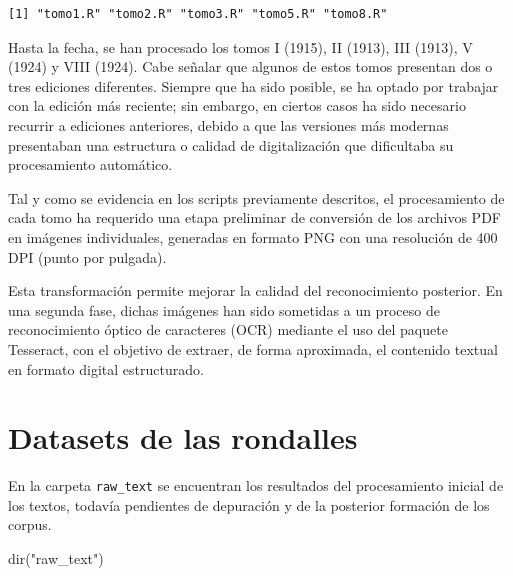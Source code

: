 \documentclass[
  letterpaper,
  DIV=11,
  numbers=noendperiod]{scrreprt}
\newenvironment{Shaded}{\begin{snugshade}}{\end{snugshade}}
\newcommand{\AttributeTok}[1]{\textcolor[rgb]{0.40,0.45,0.13}{#1}}
\newcommand{\FunctionTok}[1]{\textcolor[rgb]{0.28,0.35,0.67}{#1}}
\newcommand{\NormalTok}[1]{\textcolor[rgb]{0.00,0.23,0.31}{#1}}
\newcommand{\SpecialCharTok}[1]{\textcolor[rgb]{0.37,0.37,0.37}{#1}}
\newcommand{\StringTok}[1]{\textcolor[rgb]{0.13,0.47,0.30}{#1}}
\begin{document}
\begin{Shaded}
\end{Shaded}

\begin{verbatim}
[1] "tomo1.R" "tomo2.R" "tomo3.R" "tomo5.R" "tomo8.R"
\end{verbatim}

Hasta la fecha, se han procesado los tomos I (1915), II (1913), III
(1913), V (1924) y VIII (1924). Cabe señalar que algunos de estos tomos
presentan dos o tres ediciones diferentes. Siempre que ha sido posible,
se ha optado por trabajar con la edición más reciente; sin embargo, en
ciertos casos ha sido necesario recurrir a ediciones anteriores, debido
a que las versiones más modernas presentaban una estructura o calidad de
digitalización que dificultaba su procesamiento automático.

Tal y como se evidencia en los scripts previamente descritos, el
procesamiento de cada tomo ha requerido una etapa preliminar de
conversión de los archivos PDF en imágenes individuales, generadas en
formato PNG con una resolución de 400 DPI (punto por pulgada).

Esta transformación permite mejorar la calidad del reconocimiento
posterior. En una segunda fase, dichas imágenes han sido sometidas a un
proceso de reconocimiento óptico de caracteres (OCR) mediante el uso del
paquete Tesseract, con el objetivo de extraer, de forma aproximada, el
contenido textual en formato digital estructurado.


\chapter{Datasets de las rondalles}\label{datasets-de-las-rondalles}

En la carpeta \texttt{raw\_text} se encuentran los resultados del
procesamiento inicial de los textos, todavía pendientes de depuración y
de la posterior formación de los corpus.

\begin{Shaded}
\begin{Highlighting}[]
\FunctionTok{dir}\NormalTok{(}\StringTok{"raw\_text"}\NormalTok{)}
\end{Highlighting}
\end{Shaded}
\end{document}
